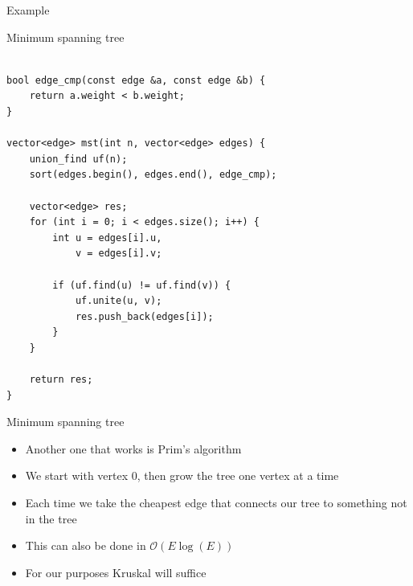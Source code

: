 \documentclass{beamer}
\begin{document}
\begin{frame}[plain]{Example}
\begin{center}
    \end{center}
\end{frame}

\begin{frame}{Minimum spanning tree}
    \begin{verbatim}

bool edge_cmp(const edge &a, const edge &b) {
    return a.weight < b.weight;
}

vector<edge> mst(int n, vector<edge> edges) {
    union_find uf(n);
    sort(edges.begin(), edges.end(), edge_cmp);

    vector<edge> res;
    for (int i = 0; i < edges.size(); i++) {
        int u = edges[i].u,
            v = edges[i].v;

        if (uf.find(u) != uf.find(v)) {
            uf.unite(u, v);
            res.push_back(edges[i]);
        }
    }

    return res;
}
    \end{verbatim}
\end{frame}

\begin{frame}[plain]{Minimum spanning tree}
    \begin{itemize}
        \item Another one that works is Prim's algorithm
        \item We start with vertex $0$, then grow the tree one vertex at a time
        \item Each time we take the cheapest edge that connects our tree to something not in the tree
        \item This can also be done in $\mathcal{O}(E\log(E))$
        \item For our purposes Kruskal will suffice
    \end{itemize}
\end{frame}
\end{document}
